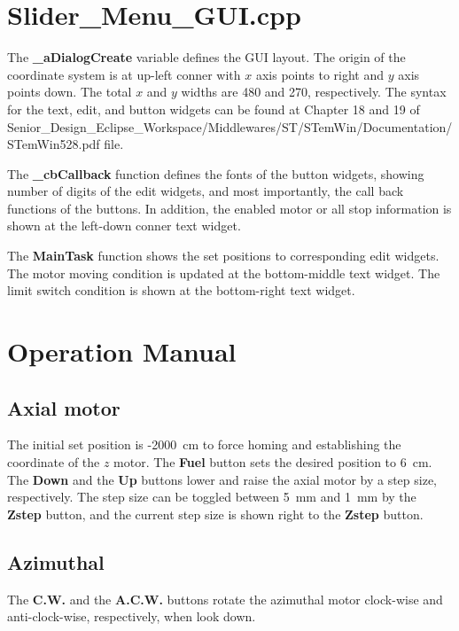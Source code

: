 \documentclass[review,number,sort&compress]{elsarticle}
\begin{document}
\section{Slider\_Menu\_GUI.cpp}
The \textbf{\_aDialogCreate} variable defines the GUI layout.
The origin of the coordinate system is at up-left conner with  $x$ axis points to right and $y$ axis points down.
The total $x$ and $y$ widths are 480 and 270, respectively.
The syntax for the text, edit, and button widgets can be found at Chapter 18 and 19 of Senior\_Design\_Eclipse\_Workspace/Middlewares/ST/STemWin/Documentation/STemWin528.pdf file.

The \textbf{\_cbCallback} function defines the fonts of the button widgets, showing number of digits of the edit widgets, and most importantly, the call back functions of the buttons.
In addition, the enabled motor or all stop information is shown at the left-down conner text widget.

The \textbf{MainTask} function shows the set positions to corresponding edit widgets.
The motor moving condition is updated at the bottom-middle text widget.
The limit switch condition is shown at the bottom-right text widget.

\section{Operation Manual}
\subsection{Axial motor}
The initial set position is -2000~cm to force homing  and establishing the coordinate of the $z$ motor.
The \textbf{Fuel} button sets the desired position to 6~cm.
The \textbf{Down} and the \textbf{Up} buttons lower and raise the axial motor by a step size, respectively.
The step size can be toggled between 5~mm and 1~mm by the \textbf{Zstep} button, and the current step size is shown right to the \textbf{Zstep} button.

\subsection{Azimuthal}
The \textbf{C.W.} and the \textbf{A.C.W.} buttons rotate the azimuthal motor clock-wise and anti-clock-wise, respectively, when look down.
\end{document}
